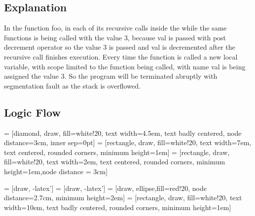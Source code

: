 \documentclass[journal,12pt,twocolumn]{IEEEtran}
\begin{document}
\subsection{Explanation}
In the function foo, in each of its recursive calls inside the while the same functions is being called with the value 3, because val is passed with post decrement operator so the value 3 is passed and val is decremented after the recursive call finishes execution. Every time the function is called a new local variable, with scope limited to the function being called, with name val is being assigned the value 3. So the program will be terminated abruptly with segmentation fault as the stack is overflowed.


\subsection{Logic Flow}
 = [diamond, draw, fill=white!20, 
    text width=4.5em, text badly centered, node distance=3cm, inner sep=0pt]
 = [rectangle, draw, fill=white!20, 
    text width=7em, text centered, rounded corners, minimum height=1em]
 = [rectangle, draw, fill=white!20, 
    text width=2em, text centered, rounded corners, minimum height=1em,node distance = 3cm]


 = [draw, -latex']
 = [draw, -latex']
 = [draw, ellipse,fill=red!20, node distance=2.7cm,
    minimum height=2em]
 = [rectangle, draw, fill=white!20, 
    text width=10em, text badly centered, rounded corners, minimum height=1em]

\begin{figure}[!h]
\centering
{}

\end{figure}
\end{document}
